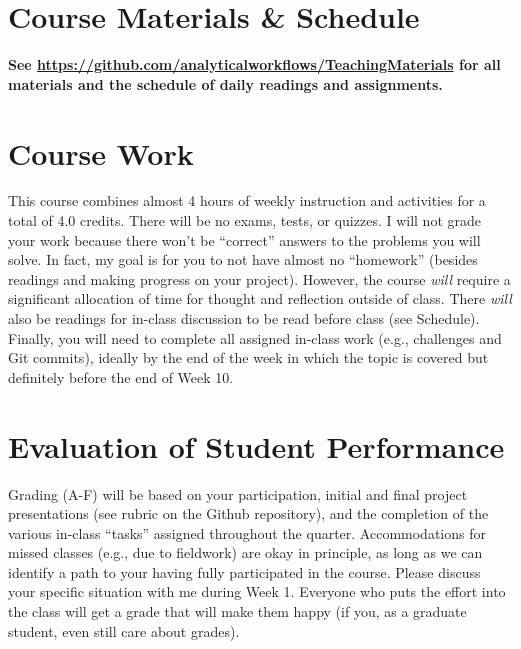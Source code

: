 \documentclass[10pt]{article}
\begin{document}
\section*{Course Materials \& Schedule}
\noindent
\begin{center}
\textbf{See
\href{https://github.com/analyticalworkflows}{https://github.com/analyticalworkflows/TeachingMaterials}
 for all materials and the schedule of daily readings and assignments.}
\end{center}

\section*{Course Work}
This course combines almost 4 hours of weekly instruction and activities for a total of 4.0 credits.
There will be no exams, tests, or quizzes.
I will not grade your work because there won't be ``correct'' answers to the problems you will 
solve.
In fact, my goal is for you to not have almost no ``homework'' (besides readings and making progress 
on your project).
However, the course \textit{will} require a significant allocation of time for thought and reflection outside 
of class.
There \textit{will} also be readings for in-class discussion to be read before class (see Schedule).
Finally, you will need to complete all assigned in-class work (e.g., challenges and Git commits), ideally 
by the end of the week in which the topic is covered but definitely before the end of Week 10.

\section*{Evaluation of Student Performance}
Grading (A-F) will be based on your participation, 
initial and final project presentations (see rubric on the Github repository), 
and the completion of the various in-class ``tasks'' assigned throughout the quarter.
Accommodations for missed classes (e.g., due to fieldwork) are okay in principle, as long as we can 
identify a path to your having fully participated in the course. 
Please discuss your specific situation with me during Week 1. 
Everyone who puts the effort into the class will get a grade that will make them happy (if you, as a 
graduate student, even still care about grades).
\end{document}
